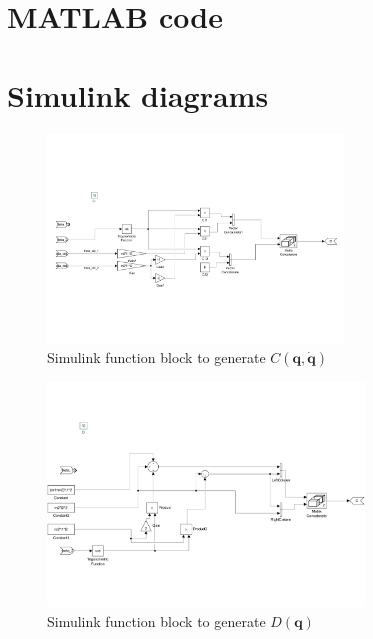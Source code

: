 \documentclass[a4paper]{scrartcl}
\begin{document}
\clearpage
\appendix
\appendixpage
\addappheadtotoc

\section{MATLAB code}\label{sec:matlab}



\section{Simulink diagrams}\label{sec:simulink}
\begin{figure}[ht]
	\centering
	\includegraphics[width=0.70\textwidth]{fig/C_func.pdf}
	\caption{Simulink function block to generate $C(\bm{q}, \dot{\bm{q}})$}
	\label{fig:genC}
\end{figure}
\begin{figure}[ht]
	\centering
	\includegraphics[width=0.75\textwidth]{fig/D_func.pdf}
	\caption{Simulink function block to generate $D(\bm{q})$}
	\label{fig:genD}
\end{figure}
\end{document}
